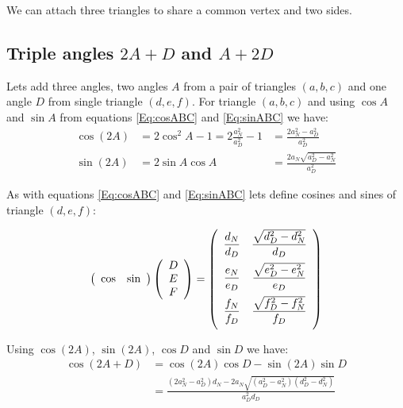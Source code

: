 \documentclass[11pt]{article}
\begin{document}
We can attach three triangles to share a common vertex and two sides.

\subsection{Triple angles $2A+D$ and $A+2D$}

Lets add three angles, two angles $A$ from a pair of triangles $(a,b,c)$ and one angle $D$ from single triangle $(d,e,f)$.
For triangle $(a,b,c)$ and using $\cos{A}$ and $\sin{A}$ from equations \ref{Eq:cosABC} and \ref{Eq:sinABC} we have:
\begin{align}
\cos{(2A)} &= 2\cos^2{A} - 1 = 2\frac{a_N^2}{a_D^2} - 1 &= \frac{2a_N^2 - a_D^2}{a_D^2}\\
\sin{(2A)} &= 2\sin{A}\cos{A} &= \frac{2a_N\sqrt{a_D^2 - a_N^2}}{a_D^2}
\end{align}

As with equations \ref{Eq:cosABC} and \ref{Eq:sinABC} lets define cosines and sines of triangle $(d,e,f)$:

\begin{equation}\label{Eq:cossinDEF}
\left({\begin{array}{c c} {\cos} & {\sin}\end{array}}\right)
\left({\begin{array}{c} D\\ E\\ F\\ \end{array}}\right)
= \left({\begin{array}{c c}
\dfrac{d_N}{d_D} & \dfrac{\sqrt{d_D^2 - d_N^2}}{d_D}\\[10pt]
\dfrac{e_N}{e_D} & \dfrac{\sqrt{e_D^2 - e_N^2}}{e_D}\\[10pt]
\dfrac{f_N}{f_D} & \dfrac{\sqrt{f_D^2 - f_N^2}}{f_D}\\[10pt]
\end{array}}\right)
\end{equation}

Using $\cos{(2A)}$, $\sin{(2A)}$, $\cos{D}$ and $\sin{D}$ we have:
\begin{align}
\cos{(2A+D)} &= \cos{(2A)}\cos{D} - \sin{(2A)}\sin{D}\\
 &= \frac{(2a_N^2 - a_D^2)d_N - 2a_N\sqrt{(a_D^2 - a_N^2)(d_D^2 - d_N^2)}}{a_D^2d_D}
\end{align}
\end{document}
